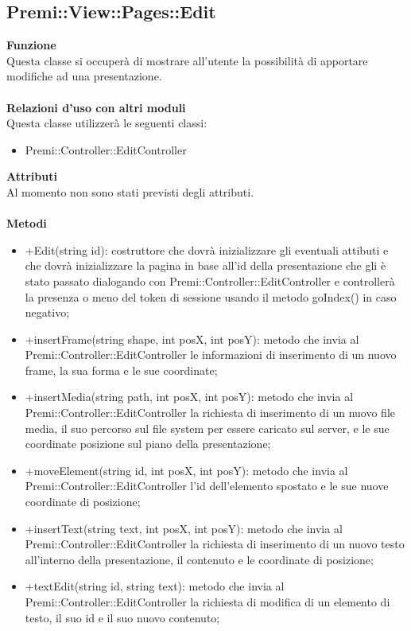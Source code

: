 {					\subsection{Premi::View::Pages::Edit}{
						\textbf{Funzione}\\
						\indent Questa classe si occuperà di mostrare all'utente la possibilità di apportare modifiche ad una presentazione.\\\\
						\textbf{Relazioni d'uso con altri moduli}\\
						\indent Questa classe utilizzerà le seguenti classi:
						\begin{itemize}
							\item Premi::Controller::EditController
						\end{itemize}
						\textbf{Attributi}\\
						\indent Al momento non sono stati previsti degli attributi.\\\\
						\textbf{Metodi}
						\begin{itemize}
							\item +Edit(string id): costruttore che dovrà inizializzare gli eventuali attibuti e che dovrà inizializzare la pagina in base all'id della presentazione che gli è stato passato dialogando con Premi::Controller::EditController e controllerà la presenza o meno del token di sessione usando il metodo goIndex() in caso negativo;
							\item +insertFrame(string shape, int posX, int posY): metodo che invia al Premi::Controller::EditController le informazioni di inserimento di un nuovo frame, la sua forma e le sue coordinate;
							\item +insertMedia(string path, int posX, int posY): metodo che invia al Premi::Controller::EditController la richiesta di inserimento di un nuovo file media, il suo percorso sul file system per essere caricato sul server, e le sue coordinate posizione sul piano della presentazione;
							\item +moveElement(string id, int posX, int posY): metodo che invia al Premi::Controller::EditController l'id dell'elemento spostato e le sue nuove coordinate di posizione;
							\item +insertText(string text, int posX, int posY): metodo che invia al Premi::Controller::EditController la richiesta di inserimento di un nuovo testo all'interno della presentazione, il contenuto e le coordinate di posizione;
							\item +textEdit(string id, string text): metodo che invia al Premi::Controller::EditController la richiesta di modifica di un elemento di testo, il suo id e il suo nuovo contenuto;

\end{itemize}}}
